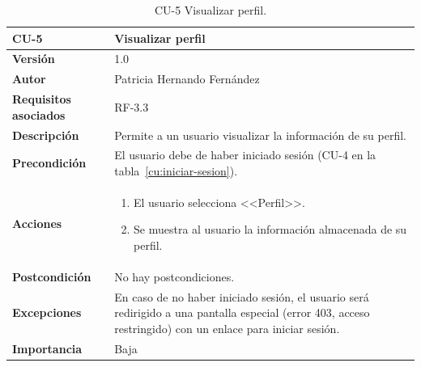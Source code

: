 \begin{table}[p]
	\centering
	\begin{tabularx}{\linewidth}{ p{} p{} }
		\toprule
		\textbf{CU-5}    & \textbf{Visualizar perfil}\\
		\toprule
		\textbf{Versión}              & 1.0    \\
		\textbf{Autor}                & Patricia Hernando Fernández \\
		\textbf{Requisitos asociados} & RF-3.3 \\
		\textbf{Descripción}          & Permite a un usuario visualizar la información de su perfil.\\
		\textbf{Precondición}         & El usuario debe de haber iniciado sesión (CU-4 en la tabla~\ref{cu:iniciar-sesion}). \\
		\textbf{Acciones}             &
		\begin{enumerate}
			\def\labelenumi{\arabic{enumi}.}
			\tightlist
			\item El usuario selecciona <<Perfil>>.
			\item Se muestra al usuario la información almacenada de su perfil.
		\end{enumerate}\\
		\textbf{Postcondición}        & No hay postcondiciones. \\
		\textbf{Excepciones}          & En caso de no haber iniciado sesión, el usuario será redirigido a una pantalla especial (error 403, acceso restringido) con un enlace para iniciar sesión. \\
		\textbf{Importancia}          & Baja \\
		\bottomrule
	\end{tabularx}
	\caption{CU-5 Visualizar perfil.}
	\label{cu:visualizar-perfil}
\end{table}



